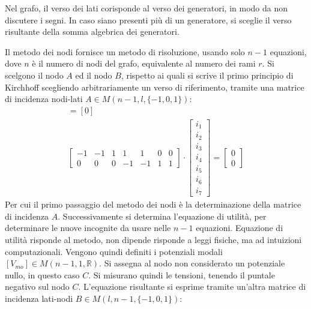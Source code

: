 \documentclass{article}
\numberwithin{equation}{subsection}
\begin{document}
Nel grafo, il verso dei lati corisponde al verso dei generatori, in modo da non discutere i segni. In caso siano presenti più di un generatore, si sceglie il verso risultante 
della somma algebrica dei generatori. %



Il metodo dei nodi fornisce un metodo di risoluzione, usando solo $n-1$ equazioni, dove $n$ è il numero di nodi del grafo, equivalente al numero dei rami $r$. 
Si scelgono il nodo $A$ ed il nodo $B$, rispetto ai quali si scrive il primo principio di Kirchhoff scegliendo arbitrariamente un verso di riferimento, tramite una matrice di 
incidenza nodi-lati $A\in M(n-1,l,\{-1,0,1\})$:
\begin{gather*}
    [A][i_l]=[0]\\
    \begin{bmatrix}
        -1&-1&1&1&1&0&0\\
        0&0&0&-1&-1&1&1
    \end{bmatrix}\cdot\begin{bmatrix}
        i_1\\
        i_2\\
        i_3\\
        i_4\\
        i_5\\
        i_6\\
        i_7
    \end{bmatrix}=\begin{bmatrix}
        0\\
        0
    \end{bmatrix}
\end{gather*}
Per cui il primo passaggio del metodo dei nodi è la determinazione della matrice di incidenza $A$. Successivamente si determina l'equazione di utilità, per determinare le nuove 
incognite da usare nelle $n-1$ equazioni. Equazione di utilità risponde al metodo, non dipende risponde a leggi fisiche, ma ad intuizioni computazionali. 
Vengono quindi definiti i potenziali modali $[V_{mo}]\in M(n-1,1,\mathbb{R})$. Si assegna al nodo non considerato un potenziale nullo, in questo caso $C$. 
Si misurano quindi le tensioni, tenendo il puntale negativo sul nodo $C$. L'equazione risultante si esprime tramite un'altra matrice di incidenza lati-nodi $B\in M(l,n-1,\{-1,0,1\})$: 
\end{document}
